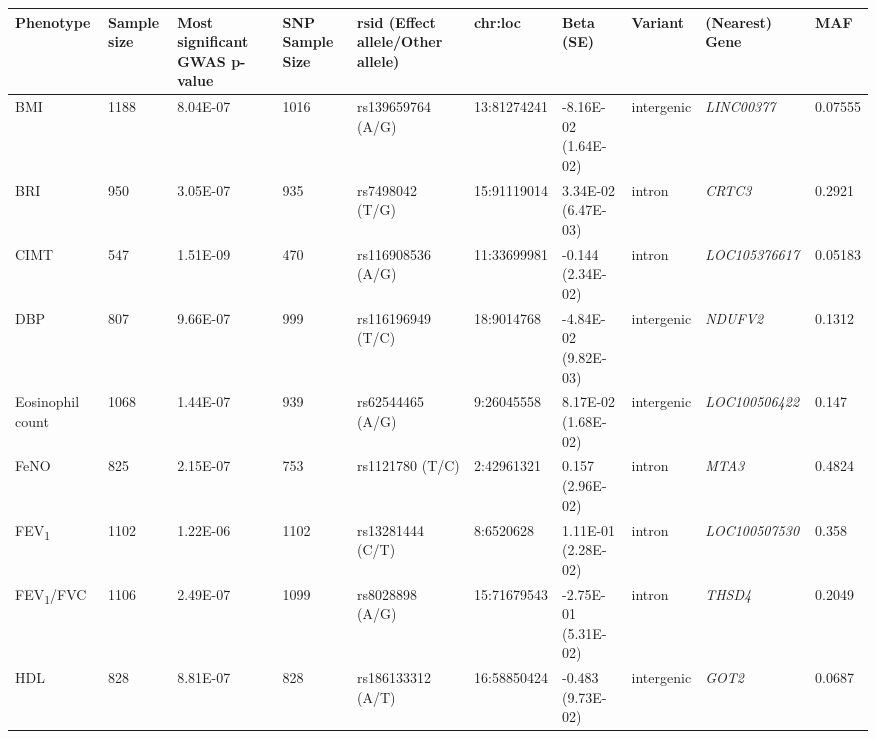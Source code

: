 \begin{landscape}

\begin{table}
\centering
\begin{adjustbox}{width={\textwidth}}
\begin{tabular}{@{}p{2cm}|p{2.5cm}p{4cm}p{3cm}p{2cm}p{3cm}p{2.1cm}p{1.5cm}p{3cm}p{2cm}@{}}
\toprule Phenotype & Sample size & Most significant GWAS p-value & SNP Sample Size & rsid (Effect allele/Other allele) & chr:loc & Beta (SE) & Variant & (Nearest) Gene & MAF \\ \midrule

BMI & 1188 & 8.04E-07 & 1016	 & rs139659764 (A/G) & 13:81274241 & -8.16E-02 (1.64E-02) & intergenic & \emph{LINC00377} & 0.07555 \\ \hline

BRI & 950 & 3.05E-07 & 935 & rs7498042 (T/G) & 15:91119014 & 3.34E-02        (6.47E-03) & intron & \emph{CRTC3} & 0.2921\\ \hline

CIMT & 547 & 1.51E-09 & 470 & rs116908536 (A/G) & 11:33699981 & -0.144         (2.34E-02) & intron & \emph{LOC105376617} & 0.05183\\ \hline

DBP & 807 & 9.66E-07 & 999 & rs116196949 (T/C) & 18:9014768 & -4.84E-02         (9.82E-03) & intergenic & \emph{NDUFV2} & 0.1312\\ \hline

Eosinophil count & 1068 & 1.44E-07 & 939 & rs62544465 (A/G) & 9:26045558 & 8.17E-02     (1.68E-02) & intergenic & \emph{LOC100506422} & 0.147\\ \hline

FeNO & 825 & 2.15E-07 & 753 & rs1121780 (T/C) & 2:42961321 & 0.157      (2.96E-02) & intron & \emph{MTA3} & 0.4824\\ \hline

FEV\textsubscript{1} & 1102 & 1.22E-06 & 1102 & rs13281444 (C/T) & 8:6520628 & 1.11E-01       (2.28E-02) & intron & \emph{LOC100507530} & 0.358\\ \hline

FEV\textsubscript{1}/FVC & 1106 & 2.49E-07 & 1099 & rs8028898 (A/G) & 15:71679543	 & -2.75E-01       (5.31E-02) & intron & \emph{THSD4} & 0.2049\\ \hline

HDL & 828 & 8.81E-07 & 828 & rs186133312 (A/T) & 16:58850424 & -0.483        (9.73E-02) & intergenic	 & \emph{GOT2} & 0.0687\\ \hline


\end{tabular}
\end{adjustbox}
\end{table}
\end{landscape}
